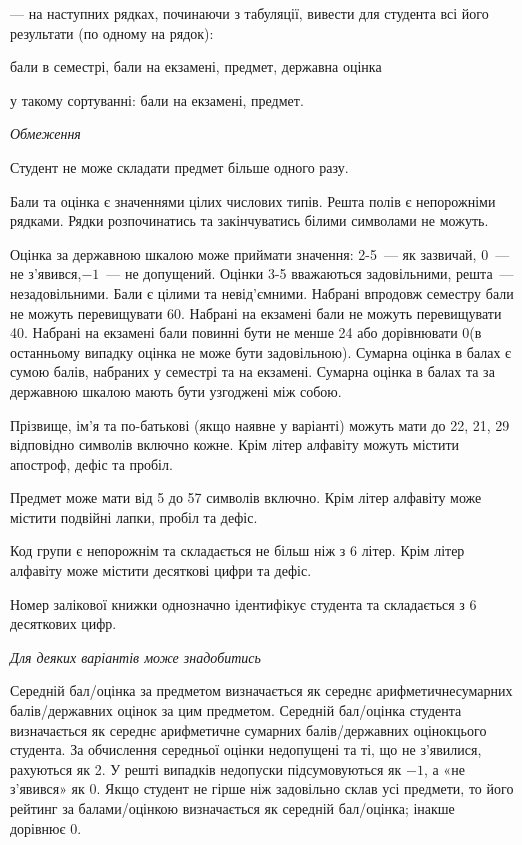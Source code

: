 \documentclass[11pt, ukrainian]{article}
\begin{document}
{\noindent}--- на наступних рядках, починаючи з табуляції, вивести для студента всі його результати (по одному на рядок):\par
бали в семестрі, бали на екзамені, предмет, державна оцінка

{\noindent}у такому сортуванні: бали на екзамені, предмет.


\bigskip\textit{Обмеження}

Студент не може складати предмет більше одного разу.

Бали та оцінка є значеннями цілих числових типів. Решта полів є непорожніми рядками.
Рядки розпочинатись та закінчуватись білими символами не можуть.

Оцінка за державною шкалою може приймати значення: 2-5~--- як зазвичай, 0~--- не з’явився,$-1$~--- не допущений. 
Оцінки 3-5 вважаються задовільними, решта~--- незадовільними. 
Бали є цілими та невід’ємними.
Набрані впродовж семестру бали не можуть перевищувати 60. 
Набрані на екзамені бали не можуть перевищувати 40. 
Набрані на екзамені бали повинні бути не менше 24 або дорівнювати 0(в останньому випадку оцінка не може бути задовільною). 
Сумарна оцінка в балах є сумою балів, набраних у семестрі та на екзамені.
Сумарна оцінка в балах та за державною шкалою мають бути узгоджені між собою.

Прізвище, ім’я та по-батькові (якщо наявне у варіанті) можуть мати до 22, 21, 29 відповідно символів включно кожне. 
Крім літер алфавіту можуть містити апостроф, дефіс та пробіл.

Предмет може мати від 5 до 57 символів включно. 
Крім літер алфавіту може містити подвійні лапки, пробіл та дефіс.

Код групи є непорожнім та складається не більш ніж з 6 літер. 
Крім літер алфавіту може містити десяткові цифри та дефіс.


Номер залікової книжки однозначно ідентифікує студента та складається з 6 десяткових цифр. 

\bigskip\textit{Для деяких варіантів може знадобитись}

Середній бал/оцінка за предметом визначається як середнє арифметичнесумарних балів/державних оцінок за цим предметом. 
Середній бал/оцінка студента визначається як середнє арифметичне сумарних балів/державних оцінокцього студента. 
За обчислення середньої оцінки недопущені та ті, що не з’явилися, рахуються як 2.
У решті випадків недопуски підсумовуються як $-1$, а «не з’явився» як 0.
Якщо студент не гірше ніж задовільно склав усі предмети, 
то його рейтинг за балами/оцінкою визначається як середній бал/оцінка; інакше дорівнює 0.
\end{document}
